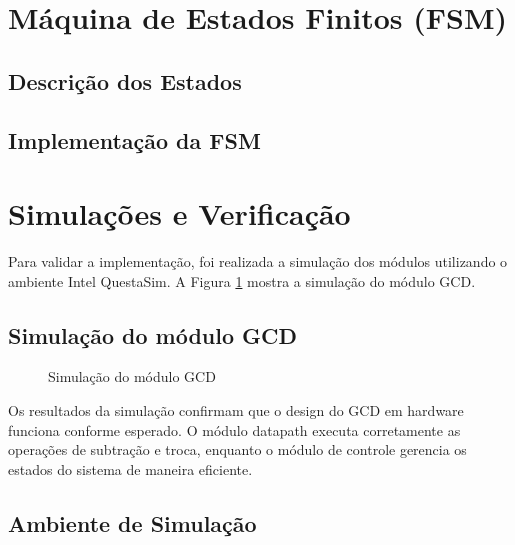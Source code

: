 \documentclass[a4paper,11pt]{article} %
\begin{document}
\section{Máquina de Estados Finitos (FSM)}

\subsection{Descrição dos Estados}

\subsection{Implementação da FSM}

\section{Simulações e Verificação}

Para validar a implementação, foi realizada a simulação dos módulos utilizando o ambiente Intel QuestaSim. A Figura \ref{fig:simulacao} mostra a simulação do módulo GCD.

\subsection{Simulação do módulo GCD}
\begin{figure}[ht]
\centering
\caption{Simulação do módulo GCD}
\label{fig:simulacao}
\end{figure}

Os resultados da simulação confirmam que o design do GCD em hardware funciona conforme esperado. O módulo datapath executa corretamente as operações de subtração e troca, enquanto o módulo de controle gerencia os estados do sistema de maneira eficiente.

\subsection{Ambiente de Simulação}
\end{document}
